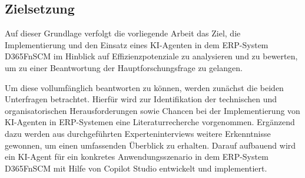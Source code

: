 \subsection{Zielsetzung}

Auf dieser Grundlage verfolgt die vorliegende Arbeit das Ziel, die Implementierung und den Einsatz eines \ac{KI}-Agenten in dem \ac{ERP}-System \ac{D365FnSCM} im Hinblick auf Effizienzpotenziale zu analysieren und zu bewerten, um zu einer Beantwortung der Hauptforschungsfrage zu gelangen.

Um diese vollumfänglich beantworten zu können, werden zunächst die beiden Unterfragen betrachtet. Hierfür wird zur Identifikation der technischen und organisatorischen Herausforderungen sowie Chancen bei der Implementierung von \ac{KI}-Agenten in \ac{ERP}-Systemen eine Literaturrecherche vorgenommen. Ergänzend dazu werden aus durchgeführten Experteninterviews weitere Erkenntnisse gewonnen, um einen umfassenden Überblick zu erhalten. Darauf aufbauend wird ein \ac{KI}-Agent für ein konkretes Anwendungsszenario in dem \ac{ERP}-System \ac{D365FnSCM} mit Hilfe von Copilot Studio entwickelt und implementiert. 